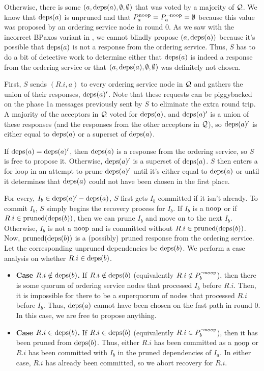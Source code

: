 Otherwise, there is some $(a, \text{deps}(a), \emptyset, \emptyset)$ that was voted
by a majority of $\mathcal{Q}$. We know that $\text{deps}(a)$ is unpruned and that
$P^{\text{noop}}_{a} = P^{\lnot \text{noop}}_{a} = \emptyset$ because this value was proposed by an
ordering service node in round $0$.
%
As we saw with the incorrect BPaxos variant in , we
cannot blindly propose $(a, \text{deps}(a))$ because it's possible that $\text{deps}(a)$ is
not a response from the ordering service.  Thus, $S$ has to do a bit of
detective work to determine either that $\text{deps}(a)$ is indeed a response from
the ordering service or that $(a, \text{deps}(a), \emptyset, \emptyset)$ was
definitely not chosen.

First, $S$ sends $(R.i, a)$ to every ordering service node in $\mathcal{Q}$ and
gathers the union of their responses, $\text{deps}(a)'$. Note that these requests can
be piggybacked on the phase 1a messages previously sent by $S$ to eliminate the
extra round trip. A majority of the acceptors in $\mathcal{Q}$ voted for
$\text{deps}(a)$, and $\text{deps}(a)'$ is a union of these responses (and the responses
from the other acceptors in $\mathcal{Q}$), so $\text{deps}(a)'$ is either equal to
$\text{deps}(a)$ or a superset of $\text{deps}(a)$.

If $\text{deps}(a) = \text{deps}(a)'$, then $\text{deps}(a)$ is a response from the ordering
service, so $S$ is free to propose it. Otherwise, $\text{deps}(a)'$ is a superset of
$\text{deps}(a)$. $S$ then enters a for loop in an attempt to prune $\text{deps}(a)'$ until
it's either equal to $\text{deps}(a)$ or until it determines that $\text{deps}(a)$ could
not have been chosen in the first place.

For every, $I_b \in \text{deps}(a)' - \text{deps}(a)$, $S$ first gets $I_b$ committed if it
isn't already. To commit $I_b$, $S$ simply begins the recovery process for
$I_b$. If $I_b$ is a $\text{noop}$ or if $R.i \in \text{pruned}(\text{deps}(b))$, then we can
prune $I_b$ and move on to the next $I_b$. Otherwise, $I_b$ is not a $\text{noop}$
and is committed without $R.i \in \text{pruned}(\text{deps}(b))$. Now, $\text{pruned}(\text{deps}(b))$
is a (possibly) pruned response from the ordering service. Let the
corresponding unpruned dependencies be $\text{deps}(b)$. We perform a case analysis
on whether $R.i \in \text{deps}(b)$.
\begin{itemize}
  \item \textbf{Case $R.i \notin \text{deps}(b)$.}
    If $R.i \notin \text{deps}(b)$ (equivalently $R.i \notin P^{\lnot \text{noop}}_{b}$), then
    there is some quorum of ordering service nodes that processed $I_b$ before
    $R.i$. Then, it is impossible for there to be a superquorum of nodes that
    processed $R.i$ before $I_b$. Thus, $\text{deps}(a)$ cannot have been chosen on
    the fast path in round $0$. In this case, we are free to propose anything.

  \item \textbf{Case $R.i \in \text{deps}(b)$.}
    If $R.i \in \text{deps}(b)$ (equivalently $R.i \in P^{\lnot \text{noop}}_{b}$), then it has
    been pruned from $\text{deps}(b)$. Thus, either $R.i$ has been committed as a
    $\text{noop}$ or $R.i$ has been committed with $I_b$ in the pruned dependencies
    of $I_a$. In either case, $R.i$ has already been committed, so we abort
    recovery for $R.i$.
\end{itemize}

